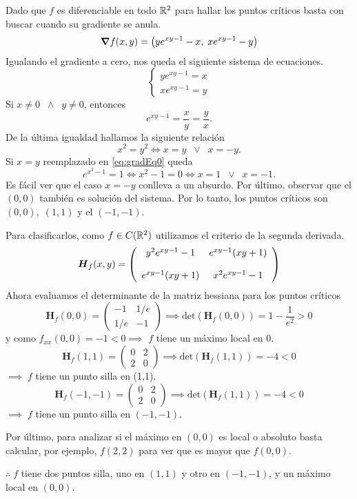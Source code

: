 \begin{solution}
    Dado que $f$ es diferenciable en todo $\mathbb{R}^2$    para hallar los puntos cr\'iticos  basta con buscar cuando su  gradiente se anula.
    \[
        \grad f(x,y)= \left( ye^{xy-1}-x,\; xe^{xy-1}-y \right)
    \]
    Igualando el gradiente a cero, nos queda el siguiente sistema de ecuaciones.
    \[
        \begin{cases}
            ye^{xy-1}=x \\
            xe^{xy-1}=y
        \end{cases}
    \]
    Si $x\neq0 \;\;\land\;\; y\neq0$, entonces
    \begin{equation}
        e^{xy-1}=\frac{x}{y}=\frac{y}{x}. \label{eq:gradEq0}
    \end{equation}
    De la última igualdad hallamos la siguiente relación  $$  x^2=y^2 \iff x=y \;\;\lor\;\; x=-y.$$
    Si  $x=y$ reemplazado en  \eqref{eq:gradEq0} queda
    $$  e^{x^2-1}=1  \iff  x^2-1=0 \iff x=1 \;\;\lor\;\; x=-1.$$
    Es f\'acil ver que el caso  $x=-y$  conlleva a un absurdo.   Por \'ultimo, observar que  el $(0,0)$  también es solución del sistema.  Por lo tanto, los puntos críticos son $(0,0),\;(1,1)$ y el $(-1,-1)$.

    Para clasificarlos,  como $f \in C(\mathbb{R}^2)$ utilizamos el criterio de la segunda derivada.
    \[
        \setlength{\abovedisplayskip}{0.5cm}
        \setlength{\belowdisplayskip}{0.5cm}
        \boldsymbol{H}_f(x,y) = \left(\begin{array}{cc}
                y^2e^{xy-1}-1  & e^{xy-1}(xy+1) \\[.4cm]
                e^{xy-1}(xy+1) & x^2e^{xy-1}-1
            \end{array}\right)
    \]
    Ahora evaluamos el determinante de la matriz hessiana para los puntos críticos
    \[
        \boldsymbol{H}_f(0,0) = \left(\begin{array}{cc}
                -1  & 1/e \\
                1/e & -1
            \end{array}\right)
        \implies \text{det} \left( \boldsymbol{H}_f(0,0) \right)  = 1 - \frac{1}{e^2} > 0
    \]
    y como $f_{xx}(0,0)=-1<0 \implies$ $f$ tiene un máximo local en 0.
    \[
        \boldsymbol{H}_f(1,1) = \left(\begin{array}{cc}
                0 & 2 \\
                2 & 0
            \end{array}\right)
        \implies \text{det} \left( \boldsymbol{H}_f(1,1) \right)  = -4 < 0
    \]
    $\implies \;f$ tiene un punto silla en (1,1).
    \[
        \boldsymbol{H}_f(-1,-1) = \left(\begin{array}{cc}
                0 & 2 \\
                2 & 0
            \end{array}\right)
        \implies \text{det} \left( \boldsymbol{H}_f(1,1) \right)  = -4 < 0
    \]
    $\implies \;f$ tiene un punto silla en $(-1,-1)$.

    Por último, para analizar si el máximo en $(0,0)$ es local o absoluto basta calcular, por ejemplo, $f(2,2)$ para ver que es mayor que $f(0,0)$.

    $\therefore\;f$ tiene dos puntos silla, uno en $(1,1)$ y otro en $(-1,-1)$, y un máximo local en $(0,0)$.

\end{solution}

